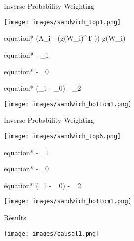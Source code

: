 \documentclass{beamer}
\begin{document}
\begin{frame}{Inverse Probability Weighting}
	\begin{center}
		\texttt{[image: images/sandwich\_top1.png]}
		\begin{empheq}[box=\bbox]{equation*}
			\left(A_i - (g(W_i)^T \hat{\alpha})\right) g(W_i)
		\end{empheq}
		\begin{empheq}[box=\wbox]{equation*}
			 - \hat{\mu}_1
		\end{empheq}
		\begin{empheq}[box=\wbox]{equation*}
			 - \hat{\mu}_0
		\end{empheq}
		\begin{empheq}[box=\wbox]{equation*}
			(\hat{\mu}_1 - \hat{\mu}_0) - \hat{\mu}_2
		\end{empheq}
		\texttt{[image: images/sandwich\_bottom1.png]}
		\setstretch{1.0}
	\end{center}
\end{frame}

\begin{frame}{Inverse Probability Weighting}
	\begin{center}
		\setstretch{0.1}
		\texttt{[image: images/sandwich\_top6.png]}
		\begin{empheq}[box=\wbox]{equation*}
			 - \hat{\mu}_1
		\end{empheq}
		\begin{empheq}[box=\wbox]{equation*}
			 - \hat{\mu}_0
		\end{empheq}
		\begin{empheq}[box=\wbox]{equation*}
			(\hat{\mu}_1 - \hat{\mu}_0) - \hat{\mu}_2
		\end{empheq}
		\texttt{[image: images/sandwich\_bottom1.png]}
	\end{center}
\end{frame}

\begin{frame}{Results}
	\begin{center}
		\texttt{[image: images/causal1.png]}
	\end{center}
\end{frame}
\end{document}
